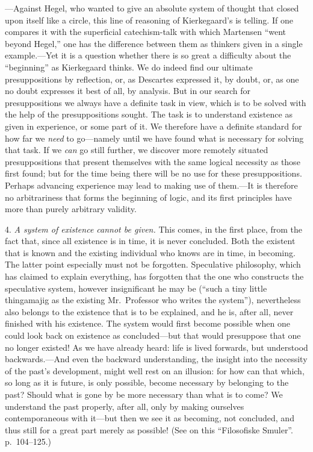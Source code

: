 \documentclass[12pt,a4paper]{book}
\newcommand{\opage}[1]{\marginnote{\footnotesize\textit{[#1]}}}
\begin{document}
---Against Hegel, who wanted to give an absolute system of thought that
closed upon itself like a circle, this line of reasoning of Kierkegaard's
is telling. If one
\opage{62}compares it with the superficial catechism-talk with which Martensen
``went beyond Hegel,'' one has the difference between them as thinkers
given in a single example.---Yet it is a question whether there is so
great a difficulty about the ``beginning'' as Kierkegaard thinks. We do
indeed find our ultimate presuppositions by reflection, or, as Descartes
expressed it, by doubt, or, as one no doubt expresses it best of all, by
analysis. But in our search for presuppositions we always have a
definite task in view, which is to be solved with the help of the
presuppositions sought. The task is to understand existence as given in
experience, or some part of it. We therefore have a definite standard for
how far we \textit{need} to go---namely until we have found what is
necessary for solving that task. If we \textit{can} go still further, we
discover more remotely situated presuppositions that present themselves
with the same logical necessity as those first found; but for the time
being there will be no use for these presuppositions. Perhaps advancing
experience may lead to making use of them.---It is therefore no
arbitrariness that forms the beginning of logic, and its first principles
have more than purely arbitrary validity.

4. \textit{A system of existence cannot be given.} This comes, in the
first place, from the fact that, since all existence is in time, it is
never concluded. Both the existent that is known and the existing
individual who knows are in time, in becoming. The latter point
especially must not be forgotten. Speculative philosophy, which has
claimed to explain everything, has forgotten that the one who constructs
the speculative system, however insignificant he may be (``such a tiny
little thingamajig as the existing Mr.\ Professor who writes the
system''), nevertheless also belongs to the existence that is to be
explained, and he is, after all, never finished
\opage{63}with his existence. The system would first become possible when one
could look back on existence as concluded---but that would presuppose
that one no longer existed! As we have already heard: life is lived
forwards, but understood backwards.---And even the backward
understanding, the insight into the necessity of the past's development,
might well rest on an illusion: for how can that which, so long as it is
future, is only possible, become necessary by belonging to the past?
Should what is gone by be more necessary than what is to come? We
understand the past properly, after all, only by making ourselves
contemporaneous with it---but then we see it as becoming, not concluded,
and thus still for a great part merely as possible!
(See on this ``Filosofiske Smuler''. p.~104--125.)
\end{document}
